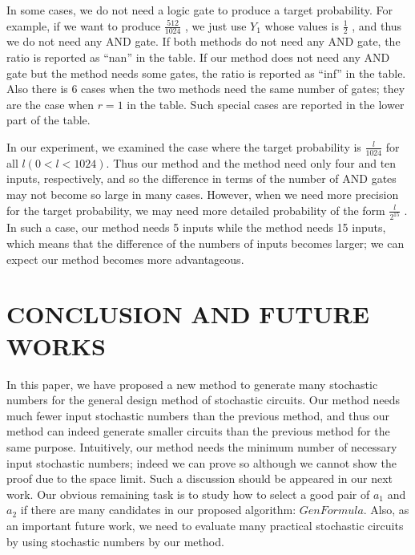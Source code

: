 \documentclass[10pt,conference]{IEEEtran}
\begin{document}
\par
In some cases, we do not need a logic gate to produce a
target probability. For example, if we want to produce $\frac{512}{1024}$ , we just use $Y_1$ whose values is $\frac{1}{2}$ , and thus we do not need
any AND gate. If both methods do not need any AND gate,
the ratio is reported as “nan” in the table. If our method does
not need any AND gate but the method \cite{fifteen} needs some gates,
the ratio is reported as “inf” in the table. Also there is 6 cases
when the two methods need the same number of gates; they
are the case when $r = 1$ in the table. Such special cases are
reported in the lower part of the table.
\par
In our experiment, we examined the case where the target
probability is $\frac{l}{1024}$ for all $l (0 <l< 1024)$. Thus our
method and the method \cite{fifteen} need only four and ten inputs, respectively, and so the difference in terms of the number of AND gates may not become so large in many cases. However, when we need more precision for the target probability, we
may need more detailed probability of the form $\frac{l}{2^15}$ . In such a case, our method needs 5 inputs while the method \cite{fifteen} needs
15 inputs, which means that the difference of the numbers of
inputs becomes larger; we can expect our method becomes more advantageous.

\section{CONCLUSION AND FUTURE WORKS}
\par
In this paper, we have proposed a new method to generate
many stochastic numbers for the general design method
of stochastic circuits. Our method needs much fewer input
stochastic numbers than the previous method, and thus our
method can indeed generate smaller circuits than the previous
method for the same purpose. Intuitively, our method needs
the minimum number of necessary input stochastic numbers;
indeed we can prove so although we cannot show the proof
due to the space limit. Such a discussion should be appeared in
our next work. Our obvious remaining task is to study how to
select a good pair of $a_1$ and $a_2$ if there are many candidates in
our proposed algorithm: $GenFormula$. Also, as an important
future work, we need to evaluate many practical stochastic
circuits by using stochastic numbers by our method.
\end{document}
